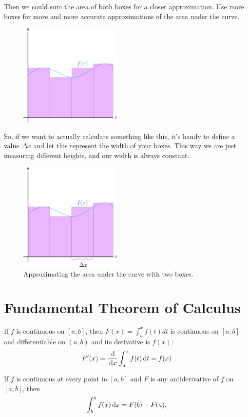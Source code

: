 Then we could sum the area of both boxes for a closer approximation.
Use more boxes for more and more accurate approximations of the area under the curve.
\begin{figure}[H]
  \begin{center}
    \includegraphics[width=2in]{continuous/integration/rei4.eps}
  \end{center}
\end{figure}
So, if we want to actually calculate something like this, it's handy to define a value $\Delta x$
and let this represent the width of your boxes.
This way we are just measuring different heights, and our width is always constant.
\begin{figure}[H]
  \begin{center}
    \includegraphics[width=2in]{continuous/integration/rei5.eps}
  \end{center}
  \caption{Approximating the area under the curve with two boxes.}
\end{figure}

\section{Fundamental Theorem of Calculus}
\begin{theorem}
  If $f$ is continuous on $[a,b]$, then $F(x)=\int^x_a f(t)dt$ is continuous on $[a,b]$ and
  differentiable on $(a,b)$ and its derivative is $f(x)$:
  \begin{equation}
    F'(x) = \frac{\,\mathrm{d}}{\,\mathrm{d} x} \int^x_a f(t)\,\mathrm{d} t=f(x)
    \label{eq:ftc1}
  \end{equation}
  \cite[p. 276]{thomas}
  \label{th:ftc1}
\end{theorem}
\begin{theorem}
  If $f$ is continuous at every point in $[a,b]$ and $F$ is any antiderivative of $f$ on $[a,b]$, then
  \begin{equation}
    \int^a_b f(x)\,\mathrm{d} x=F(b)-F(a).
    \label{eq:ftc2}
  \end{equation}
  \cite[p. 277]{thomas}
  \label{th:ftc2}
\end{theorem}

